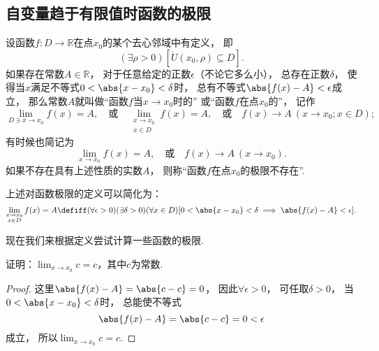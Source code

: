 \subsection{自变量趋于有限值时函数的极限}
\begin{definition}\label{definition:极限.函数极限的定义1}
设函数\(f\colon D\to\mathbb{R}\)在点\(x_0\)的某个去心邻域中有定义，
即\begin{equation*}
	(\exists\rho>0)
	[\mathring{U}(x_0,\rho) \subseteq D].
\end{equation*}
如果存在常数\(A\in\mathbb{R}\)，
对于任意给定的正数\(\epsilon\)（不论它多么小），
总存在正数\(\delta\)，
使得当\(x\)满足不等式\(0 < \abs{x-x_0} < \delta\)时，
总有不等式\(\abs{f(x)-A}<\epsilon\)成立，
那么常数\(A\)就叫做“函数\(f\)当\(x \to x_0\)时的”
或“函数\(f\)在点\(x_0\)的”，
记作\begin{equation*}
	\lim_{D \ni x \to x_0} f(x) = A,
	\quad\text{或}\quad
	\lim_{\substack{x \to x_0 \\ x \in D}} f(x) = A,
	\quad\text{或}\quad
	f(x) \to A\ (x \to x_0; x \in D);
\end{equation*}
有时候也简记为\begin{equation*}
	\lim_{x \to x_0} f(x) = A,
	\quad\text{或}\quad
	f(x) \to A\ (x \to x_0).
\end{equation*}
如果不存在具有上述性质的实数\(A\)，
则称“函数\(f\)在点\(x_0\)的极限不存在”.
\end{definition}

上述对函数极限的定义可以简化为：\begin{equation*}
	\lim_{\substack{x \to x_0 \\ x \in D}} f(x) = A
	\defiff
	(\forall \epsilon > 0)
	(\exists \delta > 0)
	(\forall x \in D)
	[0 < \abs{x - x_0} < \delta \implies \abs{f(x) - A} < \epsilon].
\end{equation*}

现在我们来根据定义尝试计算一些函数的极限.

\begin{example}
证明：\(\lim_{x \to x_0} c = c\)，其中\(c\)为常数.
\begin{proof}
这里\(\abs{f(x) - A} = \abs{c - c} = 0\)，
因此\(\forall \epsilon > 0\)，
可任取\(\delta > 0\)，
当\(0 < \abs{x - x_0} < \delta\)时，
总能使不等式\begin{equation*}
	\abs{f(x) - A} = \abs{c - c} = 0 < \epsilon
\end{equation*}成立，
所以\(\lim_{x \to x_0} c = c\).
\end{proof}
\end{example}

